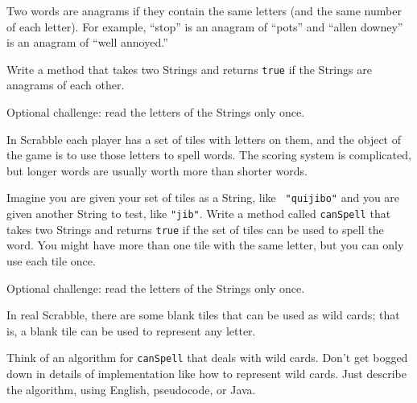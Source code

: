 \begin{exercise}
Two words are anagrams if they contain the same letters (and the
same number of each letter).  For example, ``stop'' is an anagram
of ``pots'' and ``allen downey'' is an anagram of ``well annoyed.''

Write a method that takes two Strings and returns {\tt true} if
the Strings are anagrams of each other.

Optional challenge: read the letters of the Strings only once.
\end{exercise}


\begin{exercise}
In Scrabble each player has a set of tiles with letters on them, and
the object of the game is to use those letters to spell words.  The
scoring system is complicated, but longer words are usually
worth more than shorter words.

Imagine you are given your set of tiles as a String, like {\tt
"quijibo"} and you are given another String to test, like {\tt "jib"}.
Write a method called {\tt canSpell} that takes two Strings and
returns {\tt true} if the set of tiles can be used to spell the word.  You
might have more than one tile with the same letter, but you can only
use each tile once.

Optional challenge: read the letters of the Strings only once.
\end{exercise}


\begin{exercise}
In real Scrabble, there are some blank tiles that can be used
as wild cards; that is, a blank tile can be used to represent
any letter.

Think of an algorithm for {\tt canSpell} that deals with wild
cards.  Don't get bogged down in details of implementation like
how to represent wild cards.  Just describe the algorithm, using
English, pseudocode, or Java.
\end{exercise}



